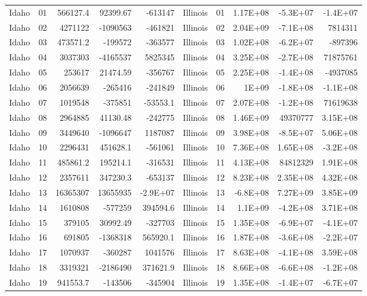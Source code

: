 \begin{landscape}
\begin{singlespace}
\begin{longtable}{lrrrr|lrrrr}
		Idaho &  01  & 566127.4 & 92399.67 & -613147 & Illinois &  01  & 1.17E+08 & -5.3E+07 & -1.4E+07 \\
		Idaho &  02  & 4271122 & -1090563 & -461821 & Illinois &  02  & 2.04E+09 & -7.1E+08 & 7814311 \\
		Idaho &  03  & 473571.2 & -199572 & -363577 & Illinois &  03  & 1.02E+08 & -6.2E+07 & -897396 \\
		Idaho &  04  & 3037303 & -4165537 & 5825345 & Illinois &  04  & 3.25E+08 & -2.7E+08 & 71875761 \\
		Idaho &  05  & 253617 & 21474.59 & -356767 & Illinois &  05  & 2.25E+08 & -1.4E+08 & -4937085 \\
		Idaho &  06  & 2056639 & -265416 & -241849 & Illinois &  06  & 1E+09 & -1.8E+08 & -1.1E+08 \\
		Idaho &  07  & 1019548 & -375851 & -53553.1 & Illinois &  07  & 2.07E+08 & -1.2E+08 & 71619638 \\
		Idaho &  08  & 2964885 & 41130.48 & -242775 & Illinois &  08  & 1.46E+09 & 49370777 & 3.15E+08 \\
		Idaho &  09  & 3449640 & -1096647 & 1187087 & Illinois &  09  & 3.98E+08 & -8.5E+07 & 5.06E+08 \\
		Idaho &  10 & 2296431 & 451628.1 & -561061 & Illinois &  10 & 7.36E+08 & 1.65E+08 & -3.2E+08 \\
		Idaho &  11 & 485861.2 & 195214.1 & -316531 & Illinois &  11 & 4.13E+08 & 84812329 & 1.91E+08 \\
		Idaho &  12 & 2357611 & 347230.3 & -653137 & Illinois &  12 & 8.23E+08 & 2.35E+08 & 4.32E+08 \\
		Idaho &  13 & 16365307 & 13655935 & -2.9E+07 & Illinois &  13 & -6.8E+08 & 7.27E+09 & 3.85E+09 \\
		Idaho &  14 & 1610808 & -577259 & 394594.6 & Illinois &  14 & 1.1E+09 & -4.2E+08 & 3.71E+08 \\
		Idaho &  15 & 379105 & 30992.49 & -327703 & Illinois &  15 & 1.35E+08 & -6.9E+07 & -4.1E+07 \\
		Idaho &  16 & 691805 & -1368318 & 565920.1 & Illinois &  16 & 1.87E+08 & -3.6E+08 & -2.2E+07 \\
		Idaho &  17 & 1070937 & -360287 & 1041576 & Illinois &  17 & 8.63E+08 & -4.1E+08 & 3.59E+08 \\
		Idaho &  18 & 3319321 & -2186490 & 371621.9 & Illinois &  18 & 8.66E+08 & -6.6E+08 & -1.2E+08 \\
		Idaho &  19 & 941553.7 & -143506 & -345904 & Illinois &  19 & 1.35E+08 & -1.4E+07 & -6.7E+07 \\

\end{longtable}
\end{singlespace}
\end{landscape}
